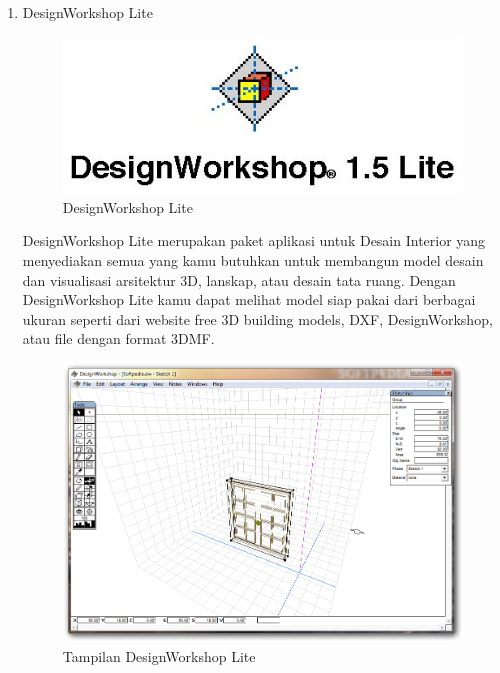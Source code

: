 \begin{enumerate}
\item DesignWorkshop Lite
\begin{figure}[H]
\centering
\includegraphics[width=1\textwidth]{figures/lite1.jpg}
\caption{DesignWorkshop Lite}
\label{print}
\end{figure}
\par DesignWorkshop Lite merupakan paket aplikasi untuk Desain Interior yang menyediakan semua yang kamu butuhkan untuk membangun model desain  dan visualisasi arsitektur 3D, lanskap, atau desain tata ruang. Dengan DesignWorkshop Lite kamu dapat melihat model siap pakai dari berbagai ukuran seperti dari website free 3D building models, DXF, DesignWorkshop, atau file dengan format 3DMF.
\begin{figure}[H]
\centering
\includegraphics[width=1\textwidth]{figures/lite2.png}
\caption{Tampilan DesignWorkshop Lite}
\label{print}
\end{figure}


\end{enumerate}
